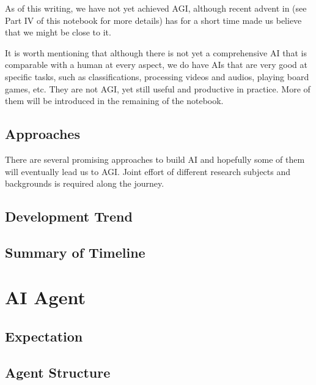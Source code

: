 As of this writing, we have not yet achieved AGI, although recent advent in  (see Part IV of this notebook for more details) has for a short time made us believe that we might be close to it.

It is worth mentioning that although there is not yet a comprehensive AI that is comparable with a human at every aspect, we do have AIs that are very good at specific tasks, such as classifications, processing videos and audios, playing board games, etc. They are not AGI, yet still useful and productive in practice. More of them will be introduced in the remaining of the notebook.

\subsection{Approaches}

There are several promising approaches to build AI and hopefully some of them will eventually lead us to AGI. Joint effort of different research subjects and backgrounds is required along the journey.

\subsection{Development Trend}

\subsection{Summary of Timeline}

\section{AI Agent}

\subsection{Expectation}

\subsection{Agent Structure}